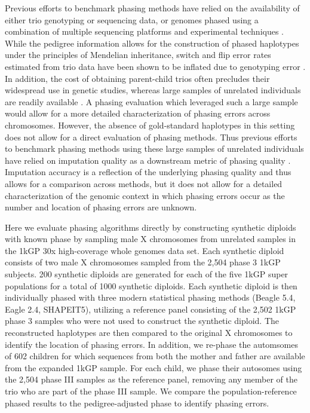 Previous efforts to benchmark phasing methods have relied on the availability of either trio genotyping or sequencing data, or genomes phased using a combination of multiple sequencing platforms and experimental techniques \citep{Choi2018}. While the pedigree information allows for the construction of phased haplotypes under the principles of Mendelian inheritance, switch and flip error rates estimated from trio data have been shown to be inflated due to genotyping error \citep{Browning2022}. In addition, the cost of obtaining parent-child trios often precludes their widespread use in genetic studies, whereas large samples of unrelated individuals are readily available \citep{ByrskaBishop2022}. A phasing evaluation which leveraged such a large sample would allow for a more detailed characterization of phasing errors across chromosomes. However, the absence of gold-standard haplotypes in this setting does not allow for a direct evaluation of phasing methods. Thus previous efforts to benchmark phasing methods using these large samples of unrelated individuals have relied on imputation quality as a downstream metric of phasing quality \citep{Stahl2021, DeMarino2022}. Imputation accuracy is a reflection of the underlying phasing quality and thus allows for a comparison across methods, but it does not allow for a detailed characterization of the genomic context in which phasing errors occur as the number and location of phasing errors are unknown. 

Here we evaluate phasing algorithms directly by constructing synthetic diploids with known phase by sampling male X chromosomes from unrelated samples in the 1kGP 30x high-coverage whole genomes data set. Each synthetic diploid consists of two male X chromosomes sampled from the 2,504 phase 3 1kGP subjects. 200 synthetic diploids are generated for each of the five 1kGP super populations for a total of 1000 synthetic diploids. Each synthetic diploid is then individually phased with three modern statistical phasing methods (Beagle 5.4, Eagle 2.4, SHAPEIT5), utilizing a reference panel consisting of the 2,502 1kGP phase 3 samples who were not used to construct the synthetic diploid. The reconstructed haplotypes are then compared to the original X chromosomes to identify the location of phasing errors. In addition, we re-phase the automsomes of 602 children for which sequences from both the mother and father are available from the expanded 1kGP sample. For each child, we phase their autosomes using the 2,504 phase III samples as the reference panel, removing any member of the trio who are part of the phase III sample. We compare the population-reference phased results to the pedigree-adjusted phase to identify phasing errors. 

